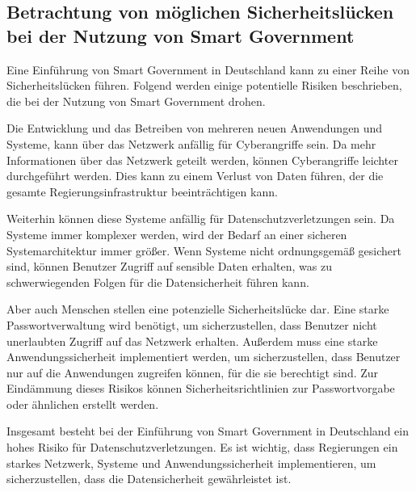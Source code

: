 \subsection{Betrachtung von möglichen Sicherheitslücken bei der Nutzung von Smart Government}
Eine Einführung von Smart Government in Deutschland kann zu einer Reihe von Sicherheitslücken führen. 
Folgend werden einige potentielle Risiken beschrieben, die bei der Nutzung von Smart Government drohen.
\par
Die Entwicklung und das Betreiben von mehreren neuen Anwendungen und Systeme, kann über das Netzwerk anfällig für Cyberangriffe sein. 
Da mehr Informationen über das Netzwerk geteilt werden, können Cyberangriffe leichter durchgeführt werden. 
Dies kann zu einem Verlust von Daten führen, der die gesamte Regierungsinfrastruktur beeinträchtigen kann.
\par
Weiterhin können diese Systeme anfällig für Datenschutzverletzungen sein. 
Da Systeme immer komplexer werden, wird der Bedarf an einer sicheren Systemarchitektur immer größer. 
Wenn Systeme nicht ordnungsgemäß gesichert sind, können Benutzer Zugriff auf sensible Daten erhalten, was zu schwerwiegenden Folgen für die Datensicherheit führen kann.
\par
Aber auch Menschen stellen eine potenzielle Sicherheitslücke dar. 
Eine starke Passwortverwaltung wird benötigt, um sicherzustellen, dass Benutzer nicht unerlaubten Zugriff auf das Netzwerk erhalten. 
Außerdem muss eine starke Anwendungssicherheit implementiert werden, um sicherzustellen, dass Benutzer nur auf die Anwendungen zugreifen können, für die sie berechtigt sind.
Zur Eindämmung dieses Risikos können Sicherheitsrichtlinien zur Passwortvorgabe oder ähnlichen erstellt werden.
\par
Insgesamt besteht bei der Einführung von Smart Government in Deutschland ein hohes Risiko für Datenschutzverletzungen. 
Es ist wichtig, dass Regierungen ein starkes Netzwerk, Systeme und Anwendungssicherheit implementieren, um sicherzustellen, dass die Datensicherheit gewährleistet ist.